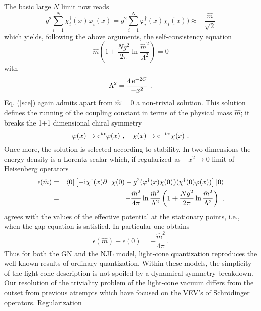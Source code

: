 \documentclass[a4paper,12pt]{article}
\begin{document}
The basic large $N$ limit now reads
$$g^{2}\sum_{i=1}^{N}\chi^{\dagger}_{i}(x)\varphi_{i}(x) = g^{2}\sum_{i=1}^{N}
\varphi^{\dagger}_{i}(x)\chi_{i}(x) )\approx -\frac{\hat{m}}{\sqrt{2}}$$
which yields, following the above arguments, the self-consistency equation \begin{equation}
  \label{sce}
 \hat{m}\left(1+\frac{Ng^{2}}{2\pi}\ln \frac{\hat{m}^{2}}{\Lambda^{2}}\right)
= 0\end{equation}
with
\begin{displaymath}
  \Lambda^{2} = \frac{4\, {\rm e}^{-2C}}{-x^{2}} \ .
\end{displaymath}
Eq. (\ref{sce}) again admits apart from $\hat{m}=0$ a non-trivial solution. This solution
defines the running of the coupling constant in terms of the physical mass $\hat{m}$; it  breaks
the 1+1 dimensional chiral symmetry
\begin{equation}
  \label{chirot2}
  \varphi(x)\rightarrow {\rm e}^{{\rm i}\alpha}\varphi(x)\ ,\quad \chi(x)\rightarrow
 {\rm e}^{-{\rm i}\alpha }\chi(x)\ . \\
\end{equation}
Once more, the solution is selected according to stability. In two dimensions the energy
density is a Lorentz scalar which, if regularized as $ -x^2 \rightarrow 0$ limit of Heisenberg
operators
\begin{eqnarray}
  \label{ende}
  \epsilon(\hat{m}) &=&  \langle 0|\left[-{\rm i}\chi^{\dagger}(x)\partial_{-}\chi(0)-g^{2}
(\varphi^{\dagger}(x)\chi(0))(
  \chi^{\dagger}(0)\varphi(x))\right]| 0 \rangle \nonumber\\& =& -\frac{\hat{m}^{2}}{4\pi}\ln
\frac{\hat{m}^{2}}{\Lambda^{2}}\left(1+\frac{Ng^{2}}{2\pi}\ln \frac{\hat{m}^{2}}
{\Lambda^{2}}\right) \ ,
\end{eqnarray}
agrees with the values of the effective potential at the stationary points, i.e., when the gap
equation is satisfied. In particular one obtains
\begin{displaymath}
\epsilon(\hat{m})- \epsilon(0) = -\frac{\hat{m}^{2}}{4\pi}\, .
\end{displaymath}
Thus for both the GN and the NJL model, light-cone quantization reproduces the well known
results of ordinary quantization. Within these models, the simplicity of the light-cone description
is not spoiled by a dynamical symmetry breakdown.  \\
Our resolution of the triviality problem of the light-cone vacuum differs from the outset from
previous attempts  which have focused on the VEV's of Schr\"odinger operators. Regularization
\end{document}
